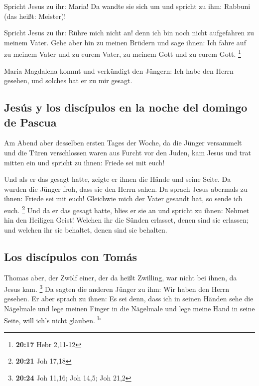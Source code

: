 Spricht Jesus zu ihr: Maria! Da wandte sie sich um und
spricht zu ihm: Rabbuni (das heißt: Meister)!

 Spricht Jesus zu ihr: Rühre mich nicht an! denn ich bin
noch nicht aufgefahren zu meinem Vater. Gehe aber hin zu meinen Brüdern
und sage ihnen: Ich fahre auf zu meinem Vater und zu eurem Vater, zu
meinem Gott und zu eurem Gott. \footnote{\textbf{20:17} Hebr 2,11-12}

 Maria Magdalena kommt und verkündigt den Jüngern: Ich
habe den Herrn gesehen, und solches hat er zu mir gesagt.

\hypertarget{jesuxfas-y-los-discuxedpulos-en-la-noche-del-domingo-de-pascua}{%
\subsection{Jesús y los discípulos en la noche del domingo de
Pascua}\label{jesuxfas-y-los-discuxedpulos-en-la-noche-del-domingo-de-pascua}}

 Am Abend aber desselben ersten Tages der Woche, da die
Jünger versammelt und die Türen verschlossen waren aus Furcht vor den
Juden, kam Jesus und trat mitten ein und spricht zu ihnen: Friede sei
mit euch!

 Und als er das gesagt hatte, zeigte er ihnen die Hände
und seine Seite. Da wurden die Jünger froh, dass sie den Herrn sahen.
 Da sprach Jesus abermals zu ihnen: Friede sei mit euch!
Gleichwie mich der Vater gesandt hat, so sende ich euch. \footnote{\textbf{20:21}
  Joh 17,18}  Und da er das gesagt hatte, blies er sie an
und spricht zu ihnen: Nehmet hin den Heiligen Geist! 
Welchen ihr die Sünden erlasset, denen sind sie erlassen; und welchen
ihr sie behaltet, denen sind sie behalten.

\hypertarget{los-discuxedpulos-con-tomuxe1s}{%
\subsection{Los discípulos con
Tomás}\label{los-discuxedpulos-con-tomuxe1s}}

 Thomas aber, der Zwölf einer, der da heißt Zwilling, war
nicht bei ihnen, da Jesus kam. \footnote{\textbf{20:24} Joh 11,16; Joh
  14,5; Joh 21,2}  Da sagten die anderen Jünger zu ihm:
Wir haben den Herrn gesehen. Er aber sprach zu ihnen: Es sei denn, dass
ich in seinen Händen sehe die Nägelmale und lege meinen Finger in die
Nägelmale und lege meine Hand in seine Seite, will ich's nicht glauben.
\textsuperscript{b}

